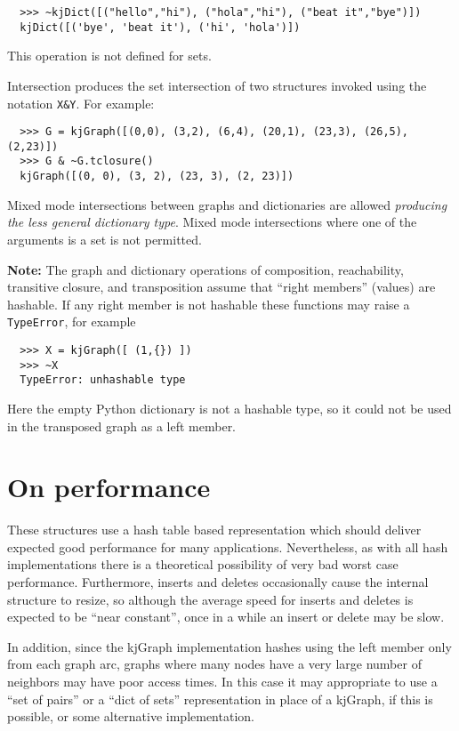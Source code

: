 \begin{description}
\begin{verbatim}
  >>> ~kjDict([("hello","hi"), ("hola","hi"), ("beat it","bye")])
  kjDict([('bye', 'beat it'), ('hi', 'hola')])
\end{verbatim}
This operation is not defined for sets.
\item{Intersection}
produces the set intersection of two structures 
invoked using the notation {\tt X\&Y}.  For example:
\begin{verbatim}
  >>> G = kjGraph([(0,0), (3,2), (6,4), (20,1), (23,3), (26,5), (2,23)])
  >>> G & ~G.tclosure()
  kjGraph([(0, 0), (3, 2), (23, 3), (2, 23)])
\end{verbatim}
Mixed mode intersections between graphs and dictionaries are allowed
{\em producing the less general dictionary type}.  Mixed mode
intersections where one of the arguments is a set is not permitted.
\end{description}

{\bf Note:}
The graph and dictionary operations of composition, reachability,
transitive closure,
and transposition assume that ``right members'' (values) are
hashable.  If any right member is not hashable these functions may
raise a {\tt TypeError}, for example
\begin{verbatim}
  >>> X = kjGraph([ (1,{}) ])
  >>> ~X
  TypeError: unhashable type
\end{verbatim}
Here the empty Python dictionary is not a hashable type, so it could
not be used in the transposed graph as a left member.

\section{On performance}

These structures use a hash table based representation which should
deliver expected good performance for many applications.
Nevertheless, as with all hash implementations there is a
theoretical possibility of very bad worst case performance.
Furthermore, inserts and deletes occasionally cause the
internal structure to resize, so although the average speed for
inserts and deletes is expected to be ``near constant'', once
in a while an insert or delete may be slow.

In addition, since the kjGraph implementation hashes using the
left member only from each graph arc, graphs where many nodes have
a very large number of neighbors may have poor access times.  In this
case it may appropriate to use a ``set of pairs'' 
or a ``dict of sets'' representation
in place of a kjGraph, if this is possible, or some alternative
implementation.

